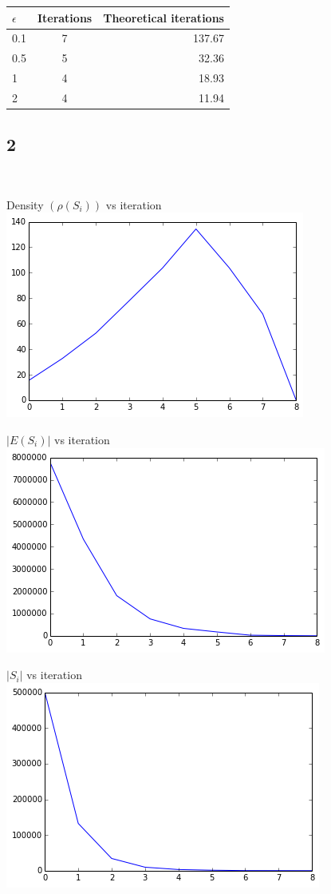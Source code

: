 \documentclass[11pt]{article}
\begin{document}
{\begin{tabular}{l | c | r}
\hline $\epsilon$ & Iterations & Theoretical iterations \\
\hline 0.1 & 7 & 137.67\\
\hline 0.5 & 5 & 32.36\\
\hline 1 & 4 & 18.93\\
\hline 2 & 4 & 11.94\\
\hline
\end{tabular}

\pagebreak[4]
\subsection*{2}
\

Density $(\rho(S_i))$ vs iteration\\
\includegraphics[scale=0.8]{q4c2density}\
\vspace{3cm}

$|E(S_i)|$ vs iteration\\
\includegraphics[scale=0.8]{q4c2indsetcnt}\\
\vspace{3cm}

$|S_i|$ vs iteration\\
\includegraphics[scale=0.8]{q4c2scnt}\


}
\end{document}
